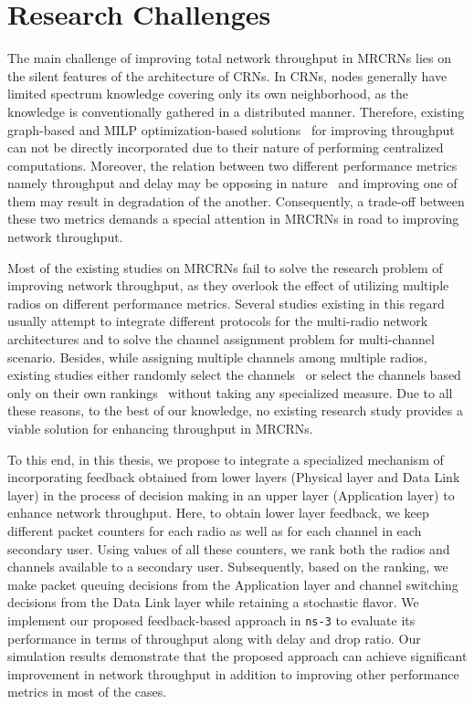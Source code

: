 \section{Research Challenges}
The main challenge of improving total network throughput in MRCRNs lies on the silent features of the architecture of CRNs. In CRNs, nodes generally have limited spectrum knowledge covering only its own neighborhood, as the knowledge is conventionally gathered in a distributed manner. Therefore, existing graph-based and MILP optimization-based solutions~\cite{hoang2008downlink,ahmed2014channel} for improving throughput can not be directly incorporated due to their nature of performing centralized computations. Moreover, the relation between two different performance metrics namely throughput and delay may be opposing in nature~\cite{gamal2004throughput} and improving one of them may result in degradation of the another. Consequently, a trade-off between these two metrics demands a special attention in MRCRNs in road to improving network throughput.

Most of the existing studies on MRCRNs fail to solve the research problem of improving network throughput, as they overlook the effect of utilizing multiple radios on different performance metrics. Several studies existing in this regard~\cite{de2012survey, feng2009joint, zhong2014capacity, li2014deterministic} usually attempt to integrate different protocols for the multi-radio network architectures and to solve the channel assignment problem for multi-channel scenario. Besides, while assigning multiple channels among multiple radios, existing studies either randomly select the channels~\cite{khan2015towards} or select the channels based only on their own rankings~\cite{zhong2014capacity} without taking any specialized measure. Due to all these reasons, to the best of our knowledge, no existing research study provides a viable solution for enhancing throughput in MRCRNs.

To this end, in this thesis, we propose to integrate a specialized mechanism of incorporating feedback obtained from lower layers (Physical layer and Data Link layer) in the process of decision making in an upper layer (Application layer) to enhance network throughput. Here, to obtain lower layer feedback, we keep different packet counters for each radio as well as for each channel in each secondary user. Using values of all these counters, we rank both the radios and channels available to a secondary user. Subsequently, based on the ranking, we make packet queuing decisions from the Application layer and channel switching decisions from the Data Link layer while retaining a stochastic flavor. We implement our proposed feedback-based approach in \texttt{ns-3} to evaluate its performance in terms of throughput along with delay and drop ratio. Our simulation results demonstrate that the proposed approach can achieve significant improvement in network throughput in addition to improving other performance metrics in most of the cases.

